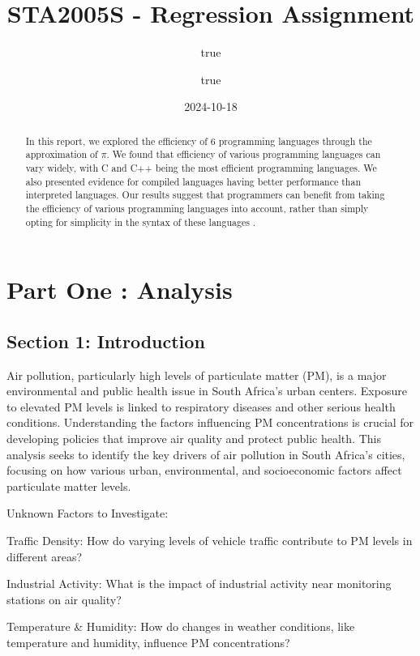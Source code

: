 \documentclass[
]{article}
\title{STA2005S - Regression Assignment}
\author{true \and true}
\date{2024-10-18}
\begin{document}
\maketitle
\begin{abstract}
In this report, we explored the efficiency of 6 programming languages
through the approximation of \(\pi\). We found that efficiency of
various programming languages can vary widely, with C and C++ being the
most efficient programming languages. We also presented evidence for
compiled languages having better performance than interpreted languages.
Our results suggest that programmers can benefit from taking the
efficiency of various programming languages into account, rather than
simply opting for simplicity in the syntax of these languages .
\end{abstract}

\newpage

\hypertarget{part-one-analysis}{%
\section{Part One : Analysis}\label{part-one-analysis}}

\hypertarget{section-1-introduction}{%
\subsection{Section 1: Introduction}\label{section-1-introduction}}

Air pollution, particularly high levels of particulate matter (PM), is a
major environmental and public health issue in South Africa's urban
centers. Exposure to elevated PM levels is linked to respiratory
diseases and other serious health conditions. Understanding the factors
influencing PM concentrations is crucial for developing policies that
improve air quality and protect public health. This analysis seeks to
identify the key drivers of air pollution in South Africa's cities,
focusing on how various urban, environmental, and socioeconomic factors
affect particulate matter levels.

Unknown Factors to Investigate:

Traffic Density: How do varying levels of vehicle traffic contribute to
PM levels in different areas?

Industrial Activity: What is the impact of industrial activity near
monitoring stations on air quality?

Temperature \& Humidity: How do changes in weather conditions, like
temperature and humidity, influence PM concentrations?
\end{document}
